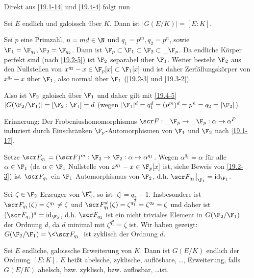 Direkt aus \ref{19.1-14} und \ref{19.4-4} folgt nun

\begin{kor} \label{19.4-5}
	Sei $E$ endlich und galoissch über $K$.
	Dann ist $|G(E/K)| = [E:K]$.
\end{kor}

\begin{ex} \label{19.4-6}
	Sei $p$ eine Primzahl, $n = md \in \N$ und $q_1 = p^m, q_2 = p^n$, sowie $\F_1 = \F_{q_1}, \F_2 = \F_{q_2}$.
	Dann ist $\F_p \subset \F_1 \subset \F_2 \subset \_{\F_p}$.
	Da endliche Körper perfekt sind (nach \ref{19.2-5}) ist $\F_2$ separabel über $\F_1$.
	Weiter besteht $\F_2$ aus den Nullstellen von $x^{q_2} - x \in \F_p[x] \subset \F_1[x]$ und ist daher Zerfällungskörper von $x^{q_2} - x$ über $\F_1$, also normal über $\F_1$ (\ref{19.2-3} und \ref{19.3-2}).

	Also ist $\F_2$ galoisch über $\F_1$ und daher gilt mit \ref{19.4-5} $|G(\F_2 / \F_1)| = [\F_2 : \F_1] = d$ (wegen $|\F_1|^d = q_1^d = (p^m)^d = p^n = q_2 = |\F_2|$).

	Erinnerung:
	Der Frobeniushomomorphismus $\scr F: \_{\F_p} \to \_{\F_p}: \alpha \to \alpha^P$ induziert durch Einschränken $\F_p$-Automorphismen von $\F_1$ und $\F_2$ nach \ref{19.1-17}.

	Setze $\scr F_{q_1} = (\scr F)^m: \F_2 \to \F_2: \alpha \mapsto \alpha^{q_1}$.
	Wegen $\alpha^{q_1} = \alpha$ für alle $\alpha \in \F_1$ (da $\alpha \in \F_1$ Nullstelle von $x^{q_1} - x \in \F_p[x]$ ist, siehe Beweis von \ref{19.2-3}) ist $\scr F_{q_1}$ ein $\F_1$ Automorphismus von $\F_2$, d.h. $\scr F_{q_1}\big|_{\F_1} = \id_{\F_1}$.

	Sei $\zeta \in \F_2$ Erzeuger von $\F_2^*$, so ist $|\zeta| = q_2 - 1$.
	Insbesondere ist $\scr F_{q_1}(\zeta) = \zeta^{q_1} \neq \zeta$ und $\scr F_{q_1}^d(\zeta) = \zeta^{q_1^{d}} = \zeta^{q_2} = \zeta$ und daher ist $(\scr F_{q_1})^d = \id_{\F_2}$, d.h. $\scr F_{q_1}$ ist ein nicht triviales Element in $G(\F_2 / \F_1)$ der Ordnung $d$, da $d$ minimal mit $\zeta^{q_1^{d}} = \zeta$ ist.
	Wir haben gezeigt: $G(\F_2 / \F_1) = \< \scr F_{q_1} \>$ ist zyklisch der Ordnung $d$.
\end{ex}

\begin{conv} \label{19.4-7}
	Sei $E$ endliche, galoissche Erweiterung von $K$.
	Dann ist $G(E / K)$ endlich der Ordnung $[E: K]$.
	$E$ heißt abelsche, zyklische, auflösbare, \dots, Erweiterung, falls $G(E / K)$ abelsch, bzw. zyklisch, bzw. auflösbar, \dots ist.
\end{conv}

